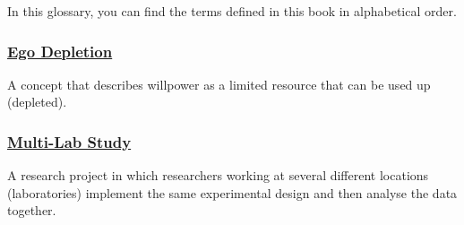 \documentclass[
  letterpaper,
]{book}
\begin{document}

In this glossary, you can find the terms defined in this book in
alphabetical order.

\subsubsection*{\texorpdfstring{\hyperref[def-egodepletion]{Ego
Depletion}}{Ego Depletion}}\label{ego-depletion-1}

A concept that describes willpower as a limited resource that can be
used up (depleted).

\subsubsection*{\texorpdfstring{\hyperref[def-multilabstudy]{Multi-Lab
Study}}{Multi-Lab Study}}\label{multi-lab-study}

A research project in which researchers working at several different
locations (laboratories) implement the same experimental design and then
analyse the data together.


\backmatter
\end{document}
